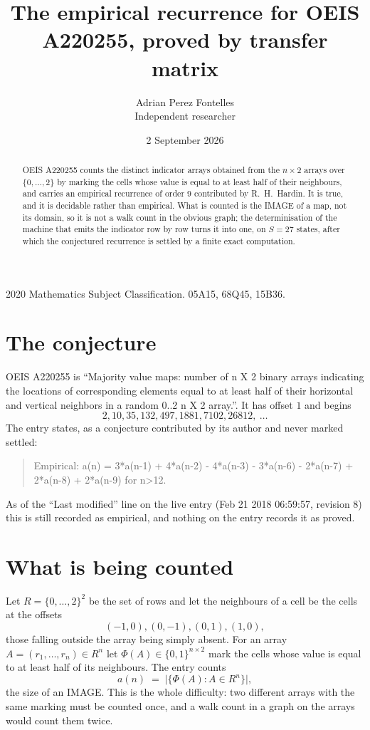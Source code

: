 \documentclass[11pt,a4paper]{article}
\title{The empirical recurrence for OEIS A220255, proved by transfer matrix}
\author{Adrian Perez Fontelles\\ \small Independent researcher}
\date{2 September 2026}
\theoremstyle{plain}
\theoremstyle{definition}
\begin{document}
\maketitle

\begin{abstract}
OEIS A220255 counts the distinct indicator arrays obtained from the $n\times2$ arrays over
$\{0,\dots,2\}$ by marking the cells whose value is equal to at least half of their neighbours, and carries an
empirical recurrence of order $9$ contributed by R.~H.~Hardin. It is true, and it is
decidable rather than empirical. What is counted is the IMAGE of a map, not its domain, so it
is not a walk count in the obvious graph; the determinisation of the machine that emits the
indicator row by row turns it into one, on $S=27$ states, after which the conjectured
recurrence is settled by a finite exact computation.
\end{abstract}

\noindent\small 2020 Mathematics Subject Classification. 05A15, 68Q45, 15B36.\normalsize

\section{The conjecture}

OEIS A220255 is ``Majority value maps: number of n X 2 binary arrays indicating the locations of corresponding elements equal to at least half of their horizontal and vertical neighbors in a random 0..2 n X 2 array.''. It has offset $1$ and begins
\[
2, 10, 35, 132, 497, 1881, 7102, 26812,\ \dots
\]
The entry states, as a conjecture contributed by its author and never marked settled:
\begin{quote}
Empirical: a(n) = 3*a(n-1) + 4*a(n-2) - 4*a(n-3) - 3*a(n-6) - 2*a(n-7) + 2*a(n-8) + 2*a(n-9) for n>12.
\end{quote}
As of the ``Last modified'' line on the live entry (Feb 21 2018 06:59:57, revision 8) this is still
recorded as empirical, and nothing on the entry records it as proved.

\section{What is being counted}

Let $R=\{0,\dots,2\}^{2}$ be the set of rows and let the neighbours of a cell be the
cells at the offsets
\[
(-1,0), (0,-1), (0,1), (1,0),
\]
those falling outside the array being simply absent. For an array
$A=(r_1,\dots,r_n)\in R^n$ let $\Phi(A)\in\{0,1\}^{n\times2}$ mark the cells whose value
is equal to at least half of its neighbours. The entry counts
\[
a(n)\;=\;\bigl|\{\Phi(A):A\in R^n\}\bigr| ,
\]
the size of an IMAGE. This is the whole difficulty: two different arrays with the same marking
must be counted once, and a walk count in a graph on the arrays would count them twice.
\end{document}

